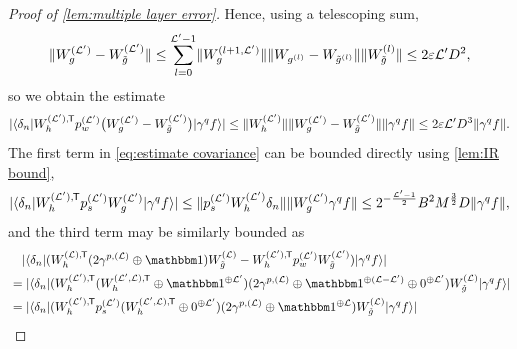 \documentclass[submission, Phys]{SciPost}
\theoremstyle{definition}
\theoremstyle{remark}
\DeclarePairedDelimiter{\abs}{\lvert}{\rvert}
\DeclarePairedDelimiter{\norm}{\lVert}{\rVert}
\DeclarePairedDelimiter{\braket}{\langle}{\rangle}
\newcommand{\op}{\oplus}
\newcommand{\eps}{\varepsilon}
\newcommand{\id}{\mathbbm 1}
\newcommand{\cL}{\mathcal L}
\newcommand*{\tran}{{\mkern-1.5mu\mathsf{T}}}
\newcommand{\wnorm}{D}
\begin{document}
\begin{appendix}
\begin{proof}[Proof of \cref{lem:multiple layer error}]
Hence, using a telescoping sum,
\begin{equation}\label{eq:Wg vs Wgtilde}
  \norm{W^{(\cL')}_{g} - W^{(\cL')}_{\tilde{g}}}
\leq \sum_{l=0}^{\cL'-1} \norm{W^{(l+1,\cL')}_{g}} \norm{W_{g^{(l)}} - W_{\tilde{g}^{(l)}}} \norm{W^{(l)}_{\tilde{g}}}
\leq 2 \eps \cL' \wnorm^2,
\end{equation}
so we obtain the estimate
\begin{equation*}
  \abs{\braket{\delta_n | W_h^{(\cL'),\tran} p^{(\cL')}_w \bigl(W_g^{(\cL')} - W_{\tilde{g}}^{(\cL')}\bigr) | \gamma^q f}}
\leq \norm{W_h^{(\cL')}} \norm{W_g^{(\cL')} - W_{\tilde{g}}^{(\cL')}} \norm{\gamma^q f}
\leq 2\eps \cL' \wnorm^3 \norm{\gamma^q f}.
\end{equation*}
The first term in \cref{eq:estimate covariance} can be bounded directly using \cref{lem:IR bound},
\begin{equation*}
  \abs{\braket{\delta_n | W_h^{(\cL'),\tran} p^{(\cL')}_sW_g^{(\cL')} |\gamma^q f}}
\leq \norm{p^{(\cL')}_s W_h^{(\cL')} \delta_n} \norm{W_g^{(\cL')}\gamma^q f}
\leq 2^{-\frac{\cL' - 1}{2}} B^2 M^{\frac32} \wnorm \norm{\gamma^q f},
\end{equation*}
and the third term may be similarly bounded as
\begin{equation*}\begin{aligned}
&\quad\abs{\braket{\delta_n | (W_h^{(\cL),\tran}(2\gamma^{p,(\cL)} \op \id)W_{\tilde{g}}^{(\cL)} - W_h^{(\cL'),\tran} p^{(\cL')}_w W_{\tilde{g}}^{(\cL')}) | \gamma^q f}} \\
&= \abs{\braket{\delta_n | (W_h^{(\cL'),\tran} (W_h^{(\cL',\cL),\tran} \op \id^{\op\cL'}) (2\gamma^{p,(\cL)} \op \id^{\op(\cL-\cL')} \op 0^{\op\cL'})W_{\tilde{g}}^{(\cL)} | \gamma^q f}} \\
&= \abs{\braket{\delta_n | (W_h^{(\cL'),\tran} p^{(\cL')}_s (W_h^{(\cL',\cL),\tran} \op 0^{\op\cL'}) (2\gamma^{p,(\cL)} \op \id^{\op\cL})W_{\tilde{g}}^{(\cL)} | \gamma^q f}} \\

\end{aligned}
\end{equation*}
\end{proof}
\end{appendix}
\end{document}
